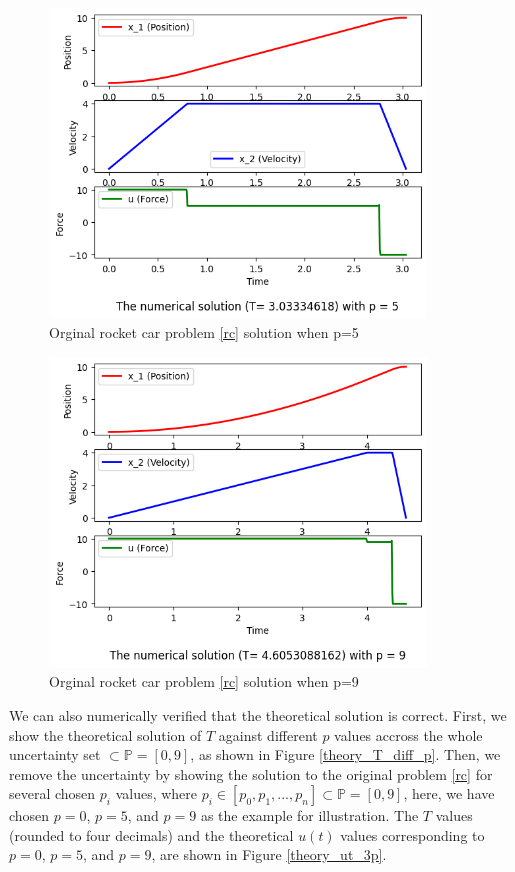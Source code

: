 \documentclass  [
  paper    = a4,
  BCOR     = 10mm,
  twoside,
  fontsize = 12pt,
  fleqn,
  toc      = bibnumbered,
  toc      = listofnumbered,
  numbers  = noendperiod,
  headings = normal,
  listof   = leveldown,
  version  = 3.03
]                                       {scrreprt}
\newcommand{\<}{\langle}
\renewcommand{\>}{\rangle}
\begin{document}
\begin{figure}[H]
	\centerline{\includegraphics[width=10cm]{original_u10_p5.png}}
	\caption{Orginal rocket car problem \ref{rc} solution when p=5}
	\label{fig1_org_u10_p5}
\end{figure}

\begin{figure}[H]
	\centerline{\includegraphics[width=10cm]{original_u10_p9.png}}
	\caption{Orginal rocket car problem \ref{rc} solution when p=9}
	\label{fig1_org_u10_p9}
\end{figure}

We can also numerically verified that the theoretical solution is correct. First, we show the theoretical solution of $T$ against different $p$ values accross the whole uncertainty set $\subset \mathbb{P} = [0,9]$, as shown in Figure \ref{theory_T_diff_p}. Then, we remove the uncertainty by showing the solution to the original problem \ref{rc} for several chosen $p_i$ values, where $ p_i  \in [p_0, p_1, ..., p_n] \subset \mathbb{P} = [0,9]$, here, we have chosen $p=0$,  $p=5$,  and $p=9$ as the example for illustration.  The $T$ values (rounded to four decimals) and the theoretical  $u(t)$ values corresponding to $p=0$,  $p=5$,  and $p=9$, are shown in Figure \ref{theory_ut_3p}. 
\end{document}
